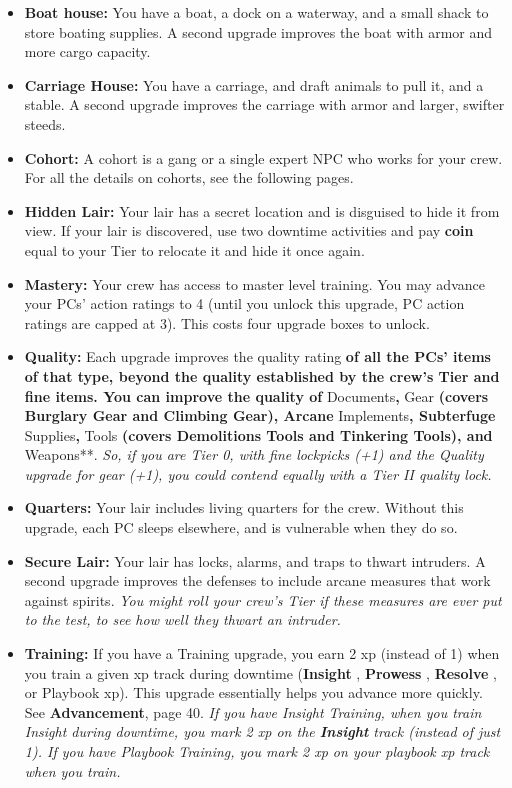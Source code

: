 \documentclass[11pt,fleqn,a5paper]{book}
\newcommand{\gameterm}[1]{\textbf{#1}}
\begin{document}
\begin{itemize}
	\item \gameterm{Boat house:} You have a boat, a dock on a waterway, and a small shack to store boating supplies. A second upgrade improves the boat with armor and more cargo capacity.
	\item \gameterm{Carriage House:}  You have a carriage, and draft animals to pull it, and a stable. A second upgrade improves the carriage with armor and larger, swifter steeds.
	\item \gameterm{Cohort:}  A cohort is a gang or a single expert NPC who works for your crew. For all the details on cohorts, see the following pages.
	\item \gameterm{Hidden Lair:}  Your lair has a secret location and is disguised to hide it from view. If your lair is discovered, use two downtime activities and pay \gameterm{coin}  equal to your Tier to relocate it and hide it once again.
	\item \gameterm{Mastery: } Your crew has access to master level training. You may advance your PCs’ action ratings to 4 (until you unlock this upgrade, PC action ratings are capped at 3). This costs four upgrade boxes to unlock.
	\item \gameterm{Quality:} \textbf{ }Each upgrade improves the quality rating\textbf{ of all the PCs’ items of that type, beyond the quality established by the crew’s Tier and fine items. You can improve the quality of }Documents\textbf{, }Gear\textbf{ (covers Burglary Gear and Climbing Gear), Arcane }Implements\textbf{, Subterfuge }Supplies\textbf{, }Tools\textbf{ (covers Demolitions Tools and Tinkering Tools), and }Weapons**. \emph{So, if you are Tier 0, with fine lockpicks (+1) and the Quality upgrade for gear (+1), you could contend equally with a Tier II quality lock.}
	\item \gameterm{Quarters:}  Your lair includes living quarters for the crew. Without this upgrade, each PC sleeps elsewhere, and is vulnerable when they do so.
	\item \gameterm{Secure Lair:} Your lair has locks, alarms, and traps to thwart intruders. A second upgrade improves the defenses to include arcane measures that work against spirits. \emph{You might roll your crew’s Tier if these measures are ever put to the test, to see how well they thwart an intruder.}
	\item \gameterm{Training: } If you have a Training upgrade, you earn 2 xp (instead of 1) when you train a given xp track during downtime (\gameterm{Insight} , \gameterm{Prowess} , \gameterm{Resolve} , or Playbook xp). This upgrade essentially helps you advance more quickly. See \textbf{Advancement}, page 40. \emph{If you have Insight Training, when you train Insight during downtime, you mark 2 xp on the \gameterm{Insight}  track (instead of just 1). If you have Playbook Training, you mark 2 xp on your playbook xp track when you train.}

\end{itemize}
\end{document}
